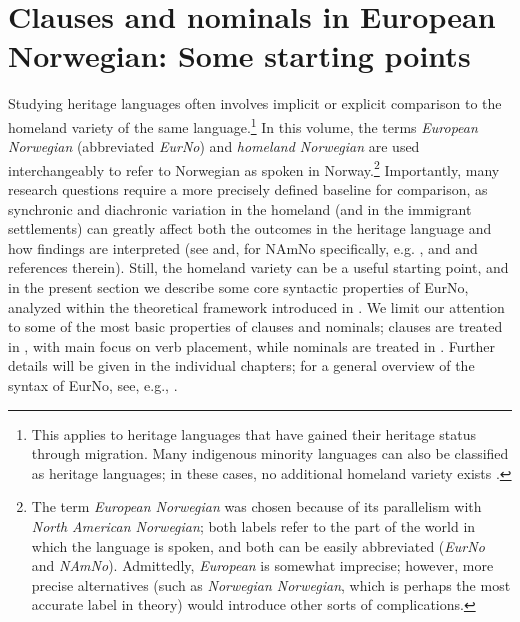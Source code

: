 \documentclass[output=paper,colorlinks,citecolor=brown]{langscibook}
\begin{document}
\section{Clauses and nominals in European Norwegian: Some starting points }\label{sec:clausesandnominals}
Studying heritage languages often involves implicit or explicit comparison to the homeland variety of the same language.\footnote{This  applies to heritage languages that have gained their heritage status through migration. Many indigenous minority languages can also be classified as heritage languages; in these cases, no additional homeland variety exists \citep[Chap. 1]{polinsky18}.} In this volume, the terms \emph{European Norwegian }(abbreviated \emph{EurNo}) and \emph{homeland Norwegian} are used interchangeably to refer to Norwegian as spoken in Norway.\footnote{The term \emph{European Norwegian} was chosen because of its parallelism with  \emph{North American Norwegian}; both labels refer to  the part of the world  in which the language is spoken, and both can be easily abbreviated (\emph{EurNo} and \emph{NAmNo}). Admittedly, \emph{European} is somewhat imprecise; however, more  precise alternatives (such as \emph{Norwegian Norwegian}, which is perhaps the most accurate label in theory) would introduce other sorts of complications. } Importantly, many research questions require a more precisely defined baseline for comparison, as  synchronic and diachronic variation in the homeland (and in the immigrant settlements) can greatly affect both the outcomes in the heritage language and how findings are interpreted (see \citealt[Chap. 1]{polinsky18} and, for NAmNo specifically, e.g. ,  and  and references therein). Still, the homeland variety can be a useful starting point, and in the present section we describe some core syntactic properties of EurNo, analyzed within the theoretical framework introduced in . We limit our attention to some of the most basic properties of clauses and nominals; clauses are treated in , with  main focus on verb placement, while nominals are treated in . Further details will be given in the individual chapters; for a general overview of the syntax of EurNo, see, e.g., \citet{faarlund2019syntax}. 
\end{document}
